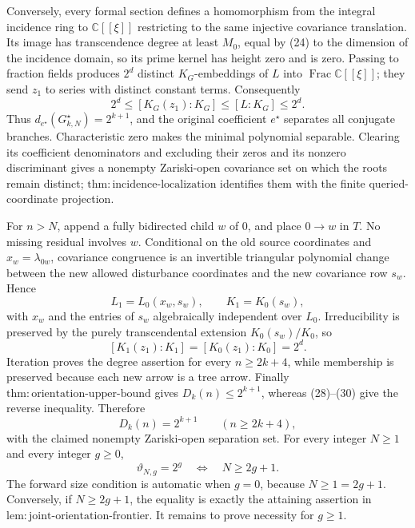 Conversely, every formal section defines a homomorphism from the integral incidence ring to \(\mathbb C[[\xi]]\) restricting to the same injective covariance translation.  Its image has transcendence degree at least \(M_0\), equal by (24) to the dimension of the incidence domain, so its prime kernel has height zero and is zero.  Passing to fraction fields produces \(2^d\) distinct \(K_G\)-embeddings of \(L\) into \(\operatorname{Frac}\mathbb C[[\xi]]\); they send \(z_1\) to series with distinct constant terms.  Consequently
\[
 2^d\le[K_G(z_1):K_G]\le[L:K_G]\le2^d.
\tag{28}
\]
Thus \(d_{e^{\star}}(G^{\star}_{k,N})=2^{k+1}\), and the original coefficient \(e^{\star}\) separates all conjugate branches.  Characteristic zero makes the minimal polynomial separable.  Clearing its coefficient denominators and excluding their zeros and its nonzero discriminant gives a nonempty Zariski-open covariance set on which the roots remain distinct; \(\mathrm{thm:incidence\mbox{-}localization}\) identifies them with the finite queried-coordinate projection.

For \(n>N\), append a fully bidirected child \(w\) of \(0\), and place \(0\to w\) in \(T\).  No missing residual involves \(w\).  Conditional on the old source coordinates and \(x_w=\lambda_{0w}\), covariance congruence is an invertible triangular polynomial change between the new allowed disturbance coordinates and the new covariance row \(s_w\).  Hence
\[
 L_1=L_0(x_w,s_w),\qquad K_1=K_0(s_w),
\tag{29}
\]
with \(x_w\) and the entries of \(s_w\) algebraically independent over \(L_0\).  Irreducibility is preserved by the purely transcendental extension \(K_0(s_w)/K_0\), so
\[
 [K_1(z_1):K_1]=[K_0(z_1):K_0]=2^d.
\tag{30}
\]
Iteration proves the degree assertion for every \(n\ge2k+4\), while membership is preserved because each new arrow is a tree arrow.  Finally \(\mathrm{thm:orientation\mbox{-}upper\mbox{-}bound}\) gives \(D_k(n)\le2^{k+1}\), whereas (28)--(30) give the reverse inequality.  Therefore
\[
 D_k(n)=2^{k+1}\qquad(n\ge2k+4),
\]
with the claimed nonempty Zariski-open separation set.
For every integer \(N\geq1\) and every integer \(g\geq0\),
\[
 \vartheta_{N,g}=2^g
 \quad\Longleftrightarrow\quad
 N\geq2g+1.
\]
The forward size condition is automatic when \(g=0\), because \(N\geq1=2g+1\).  Conversely, if \(N\geq2g+1\), the equality is exactly the attaining assertion in \(\mathrm{lem:joint\mbox{-}orientation\mbox{-}frontier}\).  It remains to prove necessity for \(g\geq1\).

